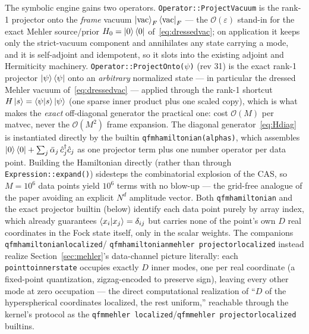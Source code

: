 \documentclass[11pt, a4paper]{article}
\begin{document}
The symbolic engine gains two operators. \texttt{Operator::ProjectVacuum}
is the rank-1 projector onto the \emph{frame} vacuum
$\ket{\mathrm{vac}}_F\bra{\mathrm{vac}}_F$ --- the
$\mathcal{O}(\varepsilon)$ stand-in for the exact Mehler source/prior
$H_0=\ket{0}\bra{0}$ of~\eqref{eq:dressedvac}; on application it keeps only
the strict-vacuum component and annihilates any state carrying a mode, and
it is self-adjoint and idempotent, so it slots into the existing adjoint
and Hermiticity machinery. \texttt{Operator::ProjectOnto($\psi$)} (rev 31)
is the exact rank-1 projector $\ket{\psi}\bra{\psi}$ onto an
\emph{arbitrary} normalized state --- in particular the dressed Mehler
vacuum of~\eqref{eq:dressedvac} --- applied through the rank-1 shortcut
$H\ket{s}=\braket{\psi|s}\ket{\psi}$ (one sparse inner product plus one
scaled copy), which is what makes the \emph{exact} off-diagonal generator
the practical one: cost $\mathcal{O}(M)$ per matvec, never the
$\mathcal{O}(M^2)$ frame expansion. The diagonal generator~\eqref{eq:Hdiag}
is instantiated directly by the builtin
\texttt{qfm\textunderscore hamiltonian(alphas)}, which assembles
$\ket{0}\bra{0}+\sum_j\bar\alpha_j\,\hat c_j^\dagger\hat c_j$ as one projector
term plus one number operator per data point. Building the Hamiltonian
directly (rather than through \texttt{Expression::expand()}) sidesteps the
combinatorial explosion of the CAS, so $M=10^6$ data points yield $10^6$ terms
with no blow-up --- the grid-free analogue of the paper avoiding an explicit
$N^d$ amplitude vector. Both \texttt{qfm\textunderscore hamiltonian} and the
exact projector builtin (below) identify each data point purely by array
index, which already guarantees $\braket{x_i|x_j}=\delta_{ij}$ but carries
none of the point's own $D$ real coordinates in the Fock state itself, only
in the scalar weights. The companions
\texttt{qfm\textunderscore hamiltonian\textunderscore localized}/
\texttt{qfm\textunderscore hamiltonian\textunderscore mehler\textunderscore
projector\textunderscore localized} instead realize
Section~\ref{sec:mehler}'s data-channel picture literally: each
\texttt{point\textunderscore to\textunderscore inner\textunderscore state}
occupies exactly $D$ inner modes, one per real coordinate (a fixed-point
quantization, zigzag-encoded to preserve sign), leaving every other mode at
zero occupation --- the direct computational realization of ``$D$ of the
hyperspherical coordinates localized, the rest uniform,'' reachable through
the kernel's protocol as the \texttt{qfm\textunderscore mehler\textunderscore
localized}/\texttt{qfm\textunderscore mehler\textunderscore
projector\textunderscore localized} builtins.
\end{document}
